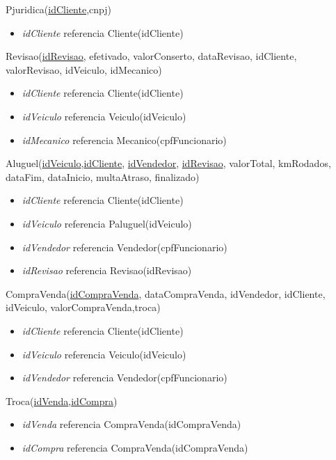 \documentclass[brazil, a4paper,12pt]{article}
\begin{document}
Pjuridica(\underline{idCliente},cnpj)
\begin{itemize}
\item \emph{idCliente} referencia Cliente(idCliente)
\end{itemize}

\vspace{1cm}

Revisao(\underline{idRevisao}, efetivado, valorConserto, dataRevisao, idCliente, valorRevisao, idVeiculo, idMecanico)

\begin{itemize}
\item \emph{idCliente} referencia Cliente(idCliente)
\item \emph{idVeiculo} referencia Veiculo(idVeiculo)
\item \emph{idMecanico} referencia Mecanico(cpfFuncionario)
\end{itemize}

\vspace{1cm}

Aluguel(\underline{idVeiculo},\underline{idCliente}, \underline{idVendedor}, \underline{idRevisao}, valorTotal, kmRodados, dataFim, dataInicio, multaAtraso, finalizado)

\begin{itemize}
\item \emph{idCliente} referencia Cliente(idCliente)
\item \emph{idVeiculo} referencia Paluguel(idVeiculo)
\item \emph{idVendedor} referencia Vendedor(cpfFuncionario)
\item \emph{idRevisao} referencia Revisao(idRevisao)
\end{itemize}

\vspace{1cm}

CompraVenda(\underline{idCompraVenda}, dataCompraVenda, idVendedor, idCliente, idVeiculo, valorCompraVenda,troca)

\begin{itemize}
\item \emph{idCliente} referencia Cliente(idCliente)
\item \emph{idVeiculo} referencia Veiculo(idVeiculo)
\item \emph{idVendedor} referencia Vendedor(cpfFuncionario)
\end{itemize}

\vspace{1cm}

Troca(\underline{idVenda},\underline{idCompra})
\begin{itemize}
\item \emph{idVenda} referencia CompraVenda(idCompraVenda)
\item \emph{idCompra} referencia CompraVenda(idCompraVenda)
\end{itemize}
\end{document}
